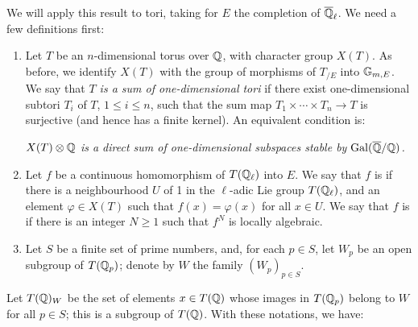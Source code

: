 We will apply this result to tori, taking for $E$ the completion
of $\overline{\mathbb{Q}}_\ell$. We need a few definitions first:
\begin{enumerate}[a/]
\item Let $T$ be an $n$-dimensional torus over $\mathbb{Q}$, with character
	group $X(T)$. As before, we identify $X(T)$ with the group of morphisms
	of $T_{/E}$ into $\mathbb{G}_{m, E}$. We say that \emph{$T$ is a sum of
	one-dimensional tori} if there exist one-dimensional subtori $T_i$ of
	$T$, $1 \le i \le n$, such that the sum map $T_1 \times \cdots \times
	T_n \to T$ is surjective (and hence has a finite kernel). An equivalent
	condition is:
	\begin{displayquote}
		\slshape
		$X(T) \otimes \mathbb{Q}$ is a direct sum of one-dimensional
		\dpage
		subspaces stable by $\operatorname{Gal}(\overline{\mathbb{Q}}/\mathbb{Q})$.
	\end{displayquote}

\item Let $f$ be a continuous homomorphism of $T(\mathbb{Q}_\ell)$ into $E$. We say
	that $f$ is  if there is a neighbourhood $U$ of 1 in the $\ell$-adic
	Lie group $T(\mathbb{Q}_\ell)$, and an element $\varphi \in X(T)$ such that
	$f(x) = \varphi(x)$ for all $x \in U$. We say that $f$ is
	 if there is an integer $N \ge 1$ such that $f^N$ is
	locally algebraic.

\item Let $S$ be a finite set of prime numbers, and, for each $p \in S$, let
	$W_p$ be an open subgroup of $T(\mathbb{Q}_p)$; denote by $W$ the family
	$(W_p)_{p\in S}$.
\end{enumerate}
Let $T(\mathbb{Q})_W$ be the set of elements $x \in T(\mathbb{Q})$ whose images in
$T(\mathbb{Q}_p)$ belong to $W$ for all $p \in S$; this is a subgroup of $T(\mathbb{Q})$.
With these notations, we have:

